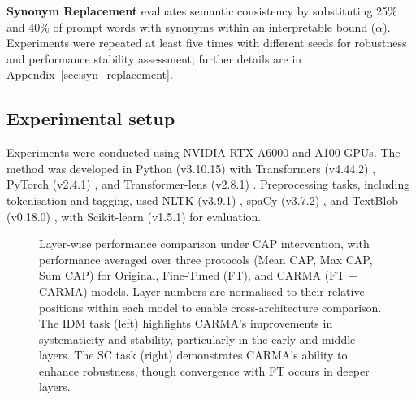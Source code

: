 \noindent\textbf{Synonym Replacement} evaluates semantic consistency by substituting 25\% and 40\% of prompt words with synonyms within an interpretable bound ($\alpha$). Experiments were repeated at least five times with different seeds for robustness and performance stability assessment; further details are in Appendix~\ref{sec:syn_replacement}.  

\subsection{Experimental setup}
Experiments were conducted using NVIDIA RTX A6000 and A100 GPUs. The method was developed in Python (v3.10.15) with Transformers (v4.44.2) \cite{wolf-etal-2020-transformers}, PyTorch (v2.4.1) \cite{paszke2019pytorch}, and Transformer-lens (v2.8.1) \cite{nanda2022transformerlens}. Preprocessing tasks, including tokenisation and tagging, used NLTK (v3.9.1) \cite{bird2009natural}, spaCy (v3.7.2) \cite{honnibal2020spacy}, and TextBlob (v0.18.0) \cite{loria2018textblob}, with Scikit-learn (v1.5.1) \cite{scikit-learn} for evaluation.

\begin{figure*}
    \centering
        \caption{Layer-wise performance comparison under CAP intervention, with performance averaged over three protocols (Mean CAP, Max CAP, Sum CAP) for Original, Fine-Tuned (FT), and CARMA (FT + CARMA) models. Layer numbers are normalised to their relative positions within each model to enable cross-architecture comparison. The IDM task (left) highlights CARMA's improvements in systematicity and stability, particularly in the early and middle layers. The SC task (right) demonstrates CARMA's ability to enhance robustness, though convergence with FT occurs in deeper layers.}

    \label{fig:carma_results_combined}
\end{figure*}